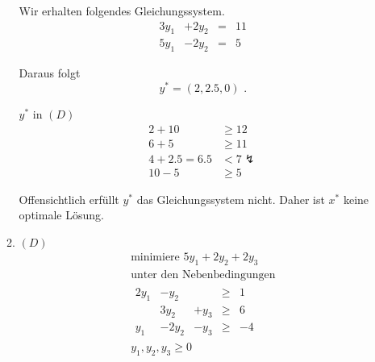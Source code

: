 \documentclass[a4paper]{scrartcl}
\begin{document}
\begin{enumerate}[label=\bfseries\arabic*.]
\begin{enumerate}
                Wir erhalten folgendes Gleichungssystem.
                \begin{equation}
                    \begin{array}{rrrcr}
                        3y_1 & +2y_2 & = & 11 \\
                        5y_1 & -2y_2 & = & 5
                    \end{array}
                \end{equation}

                Daraus folgt
                \begin{equation}
                    y^* = \left( 2, 2.5, 0 \right) \text{ .}
                \end{equation}
                
                $y^*$ in $(D)$
                \begin{equation}
                    \begin{split}
                        2 + 10 &\geq 12 \\
                        6 + 5 &\geq 11 \\
                        4 + 2.5 = 6.5 &< 7 \lightning \\
                        10 - 5 &\geq 5
                    \end{split}
                \end{equation}
                
                Offensichtlich erfüllt $y^*$ das Gleichungssystem nicht.
                Daher ist $x^*$ keine optimale Lösung.

            \item $(D)$
                \begin{equation}
                    \begin{gathered}
                        \text{minimiere }
                        5y_1 +2y_2 +2y_3 \\
                        \text{unter den Nebenbedingungen} \\
                        \begin{array}{rrrcr}
                            2y_1 & -y_2 &  & \geq & 1 \\
                             & 3y_2 & +y_3 & \geq & 6 \\
                            y_1 & -2y_2 & -y_3 & \geq & -4
                        \end{array} \\
                        y_1, y_2, y_3 \geq 0
                    \end{gathered}
                \end{equation}


\end{enumerate}
\end{enumerate}
\end{document}
